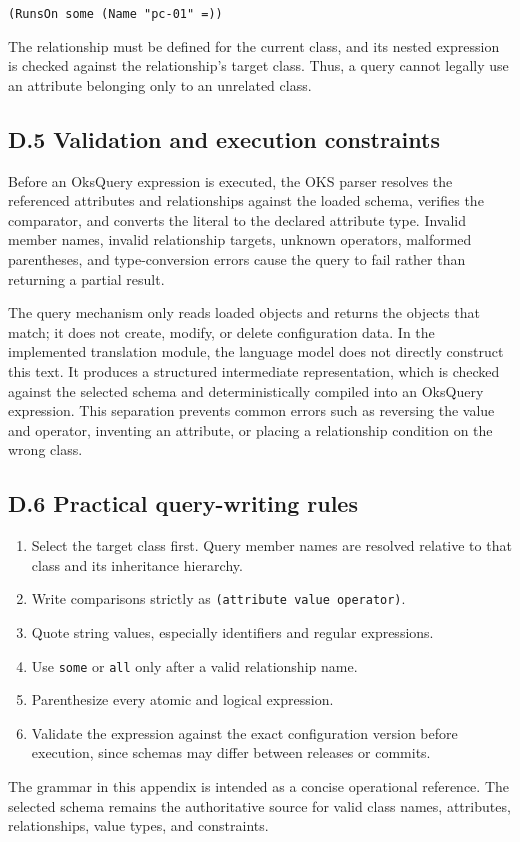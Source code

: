 \documentclass[12pt, a4paper]{report}
\begin{document}
\begin{center}
\verb|(RunsOn some (Name "pc-01" =))|
\end{center}

The relationship must be defined for the current class, and its nested
expression is checked against the relationship's target class. Thus, a query
cannot legally use an attribute belonging only to an unrelated class.

\subsection*{D.5 Validation and execution constraints}
Before an OksQuery expression is executed, the OKS parser resolves the
referenced attributes and relationships against the loaded schema, verifies
the comparator, and converts the literal to the declared attribute type.
Invalid member names, invalid relationship targets, unknown operators,
malformed parentheses, and type-conversion errors cause the query to fail
rather than returning a partial result.

The query mechanism only reads loaded objects and returns the objects that
match; it does not create, modify, or delete configuration data. In the
implemented translation module, the language model does not directly
construct this text. It produces a structured intermediate representation,
which is checked against the selected schema and deterministically compiled
into an OksQuery expression. This separation prevents common errors such as
reversing the value and operator, inventing an attribute, or placing a
relationship condition on the wrong class.

\subsection*{D.6 Practical query-writing rules}
\begin{enumerate}[leftmargin=*]
  \item Select the target class first. Query member names are resolved relative
  to that class and its inheritance hierarchy.
  \item Write comparisons strictly as \verb|(attribute value operator)|.
  \item Quote string values, especially identifiers and regular expressions.
  \item Use \texttt{some} or \texttt{all} only after a valid relationship name.
  \item Parenthesize every atomic and logical expression.
  \item Validate the expression against the exact configuration version before
  execution, since schemas may differ between releases or commits.
\end{enumerate}

The grammar in this appendix is intended as a concise operational reference.
The selected schema remains the authoritative source for valid class names,
attributes, relationships, value types, and constraints.
\end{document}

